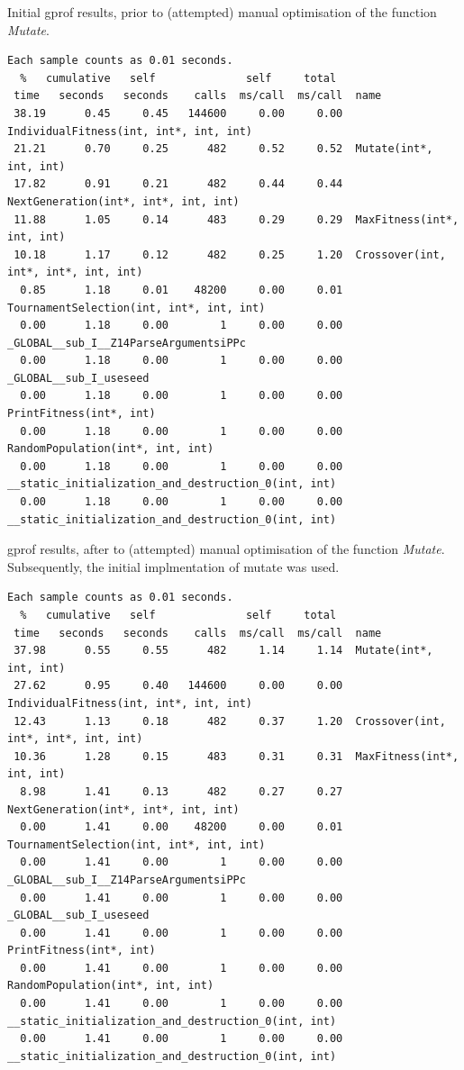 \documentclass{article}
\begin{document}
Initial gprof results, prior to (attempted) manual optimisation of the function \textit{Mutate}.
\begin{lstlisting}
Each sample counts as 0.01 seconds.
  %   cumulative   self              self     total           
 time   seconds   seconds    calls  ms/call  ms/call  name    
 38.19      0.45     0.45   144600     0.00     0.00  IndividualFitness(int, int*, int, int)
 21.21      0.70     0.25      482     0.52     0.52  Mutate(int*, int, int)
 17.82      0.91     0.21      482     0.44     0.44  NextGeneration(int*, int*, int, int)
 11.88      1.05     0.14      483     0.29     0.29  MaxFitness(int*, int, int)
 10.18      1.17     0.12      482     0.25     1.20  Crossover(int, int*, int*, int, int)
  0.85      1.18     0.01    48200     0.00     0.01  TournamentSelection(int, int*, int, int)
  0.00      1.18     0.00        1     0.00     0.00  _GLOBAL__sub_I__Z14ParseArgumentsiPPc
  0.00      1.18     0.00        1     0.00     0.00  _GLOBAL__sub_I_useseed
  0.00      1.18     0.00        1     0.00     0.00  PrintFitness(int*, int)
  0.00      1.18     0.00        1     0.00     0.00  RandomPopulation(int*, int, int)
  0.00      1.18     0.00        1     0.00     0.00  __static_initialization_and_destruction_0(int, int)
  0.00      1.18     0.00        1     0.00     0.00  __static_initialization_and_destruction_0(int, int)
\end{lstlisting}
gprof results, after to (attempted) manual optimisation of the function \textit{Mutate}. Subsequently, the initial implmentation of mutate was used. 
\begin{lstlisting}
Each sample counts as 0.01 seconds.
  %   cumulative   self              self     total           
 time   seconds   seconds    calls  ms/call  ms/call  name    
 37.98      0.55     0.55      482     1.14     1.14  Mutate(int*, int, int)
 27.62      0.95     0.40   144600     0.00     0.00  IndividualFitness(int, int*, int, int)
 12.43      1.13     0.18      482     0.37     1.20  Crossover(int, int*, int*, int, int)
 10.36      1.28     0.15      483     0.31     0.31  MaxFitness(int*, int, int)
  8.98      1.41     0.13      482     0.27     0.27  NextGeneration(int*, int*, int, int)
  0.00      1.41     0.00    48200     0.00     0.01  TournamentSelection(int, int*, int, int)
  0.00      1.41     0.00        1     0.00     0.00  _GLOBAL__sub_I__Z14ParseArgumentsiPPc
  0.00      1.41     0.00        1     0.00     0.00  _GLOBAL__sub_I_useseed
  0.00      1.41     0.00        1     0.00     0.00  PrintFitness(int*, int)
  0.00      1.41     0.00        1     0.00     0.00  RandomPopulation(int*, int, int)
  0.00      1.41     0.00        1     0.00     0.00  __static_initialization_and_destruction_0(int, int)
  0.00      1.41     0.00        1     0.00     0.00  __static_initialization_and_destruction_0(int, int)
\end{lstlisting}
\end{document}
